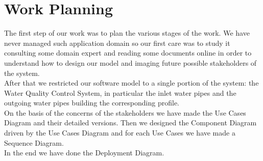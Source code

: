 \newpage\chapter{\textbf{Work Planning}}
The first step of our work was to plan the various stages of the work. We have never managed such application domain so our first care was to study it consulting some domain expert and reading some documents online in order to understand how to design our model and imaging future possible stakeholders of the system.
\\After that we restricted our software model to a single portion of the system: the Water Quality Control System, in particular the inlet water pipes and the outgoing water pipes building the corresponding profile.
\\On the basis of the concerns of the stakeholders we have made the Use Cases Diagram and their detailed versions. Then we designed the Component Diagram driven by the Use Cases Diagram and for each Use Cases we have made a Sequence Diagram.
\\In the end we have done the Deployment Diagram.
